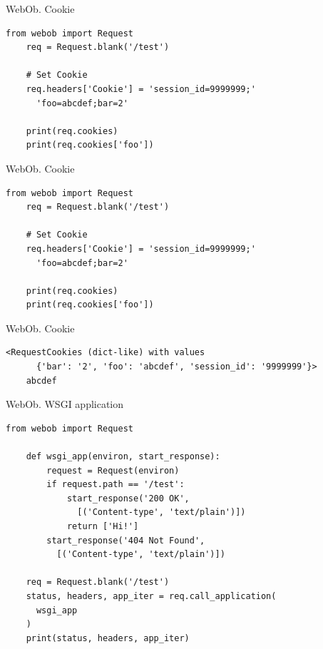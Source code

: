 \begin{frame}[fragile]{WebOb. Cookie}

  \begin{lstlisting}[style=python]
    from webob import Request
    req = Request.blank('/test')

    # Set Cookie
    req.headers['Cookie'] = 'session_id=9999999;'
      'foo=abcdef;bar=2'

    print(req.cookies)
    print(req.cookies['foo'])
  \end{lstlisting}

\end{frame}

\begin{frame}[fragile]{WebOb. Cookie}

  \begin{lstlisting}[style=python]
    from webob import Request
    req = Request.blank('/test')

    # Set Cookie
    req.headers['Cookie'] = 'session_id=9999999;'
      'foo=abcdef;bar=2'

    print(req.cookies)
    print(req.cookies['foo'])
  \end{lstlisting}

\end{frame}

\begin{frame}[fragile]{WebOb. Cookie}

  \begin{lstlisting}[style=python]
    <RequestCookies (dict-like) with values
      {'bar': '2', 'foo': 'abcdef', 'session_id': '9999999'}>
    abcdef
  \end{lstlisting}

\end{frame}

\begin{frame}[fragile]{WebOb. WSGI application}

  \begin{lstlisting}[style=python]
    from webob import Request

    def wsgi_app(environ, start_response):
        request = Request(environ)
        if request.path == '/test':
            start_response('200 OK',
              [('Content-type', 'text/plain')])
            return ['Hi!']
        start_response('404 Not Found',
          [('Content-type', 'text/plain')])

    req = Request.blank('/test')
    status, headers, app_iter = req.call_application(
      wsgi_app
    )
    print(status, headers, app_iter)
  \end{lstlisting}

\end{frame}


